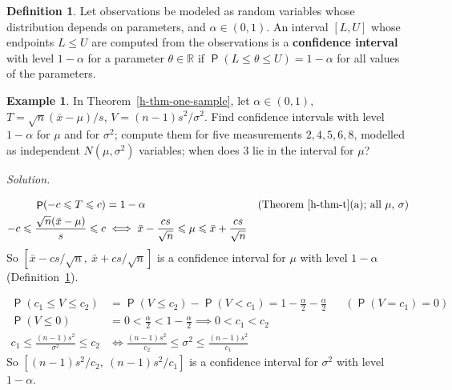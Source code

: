 \documentclass[12pt]{article}
\newcommand{\R}{\mathbb R}
\DeclareMathOperator\prb{\mathsf{P}}
\theoremstyle{definition}
\newtheorem{definition}[theorem]{Definition}
\newtheorem{example}[theorem]{Example}
\newcommand{\boardtop}{\vspace*{-\abovedisplayskip}}
\begin{document}
\begin{definition}\label{h-def-confidence}
Let observations be modeled as random variables whose distribution depends on parameters, and \(\alpha\in(0,1)\). An
interval \([L,U]\) whose endpoints \(L\leqslant U\) are computed from the observations is a \textbf{confidence
interval} with level \(1-\alpha\) for a parameter \(\theta\in\R\) if \(\prb(L\leqslant\theta\leqslant U)=1-\alpha\) for
all values of the parameters.
\end{definition}

\begin{example}\label{h-exm-one-sample}
In Theorem~\ref{h-thm-one-sample}, let \(\alpha\in(0,1)\), \(T=\sqrt n(\bar x-\mu)/s\), \(V=(n-1)s^2/\sigma^2\). Find
confidence intervals with level \(1-\alpha\) for \(\mu\) and for \(\sigma^2\); compute them for five measurements
\(2,4,5,6,8\), modelled as independent \(N(\mu,\sigma^2)\) variables; when does \(3\) lie in the interval for \(\mu\)?
\end{example}
\textit{Solution.}
\begin{board}[\(c=t_{n-1,1-\alpha/2}>0\), \(T\sim t_{n-1}\) (Theorems~\ref{h-thm-t}(a), \ref{h-thm-one-sample}(d));
\(s>0\):]
\boardtop
\begin{align*}
\prb(-c\leqslant T\leqslant c)&=1-\alpha&&\text{(Theorem~\ref{h-thm-t}(a); all \(\mu\), \(\sigma\))}\\
-c\leqslant\frac{\sqrt n(\bar x-\mu)}s\leqslant c&\iff\bar x-\frac{cs}{\sqrt n}\leqslant\mu\leqslant\bar x+\frac{cs}{\sqrt n}
\end{align*}
So \([\bar x-cs/\sqrt n,\ \bar x+cs/\sqrt n]\) is a confidence interval for \(\mu\) with level \(1-\alpha\)
(Definition~\ref{h-def-confidence}).
\end{board}
\begin{board}[\(c_1=\chi^2_{n-1,\alpha/2}\), \(c_2=\chi^2_{n-1,1-\alpha/2}\), \(V\sim\chi^2_{n-1}\)
(Theorem~\ref{h-thm-one-sample}(b)); \ref{f-quantile}, \ref{f-add}:]
\boardtop
\begin{align*}
\prb(c_1\leqslant V\leqslant c_2)&=\prb(V\leqslant c_2)-\prb(V<c_1)=1-\tfrac\alpha2-\tfrac\alpha2&&(\prb(V=c_1)=0)\\
\prb(V\leqslant0)&=0<\tfrac\alpha2<1-\tfrac\alpha2\implies0<c_1<c_2\\
c_1\leqslant\frac{(n-1)s^2}{\sigma^2}\leqslant c_2&\iff\frac{(n-1)s^2}{c_2}\leqslant\sigma^2\leqslant\frac{(n-1)s^2}{c_1}
\end{align*}
So \([(n-1)s^2/c_2,\ (n-1)s^2/c_1]\) is a confidence interval for \(\sigma^2\) with level \(1-\alpha\).
\end{board}
\end{document}
